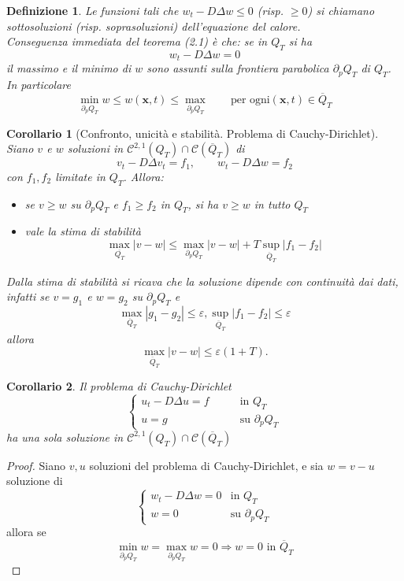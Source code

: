 \documentclass[a4paper,12pt, draft]{article}
\theoremstyle{break}
\newtheorem{corollary}{Corollario}[section]
\newtheorem{definition}{Definizione}[section]
\let\epsilon\varepsilon
\numberwithin{equation}{section}
\begin{document}
\begin{definition}
Le funzioni tali che $w_t - D\Delta w \leq 0$ (risp. $\geq 0$) si chiamano sottosoluzioni (risp. soprasoluzioni) dell'equazione del calore. \\
Conseguenza immediata del teorema (2.1) è che: se in $Q_T$ si ha
$$w_t -D \Delta w = 0$$
il massimo e il minimo di $w$ sono assunti sulla frontiera parabolica $\partial_p Q_T$ di $Q_T$. In particolare
$$
\min_{\partial_p Q_T} w \leq w(\bm{x},t) \leq \max_{\partial_p Q_T} \qquad \mbox{per ogni} (\bm{x}, t) \in \overline{Q}_T$$
\end{definition}
\begin{corollary}[Confronto, unicità e stabilità. Problema di Cauchy-Dirichlet]
Siano $v$ e $w$ soluzioni in $\mathcal{C}^{2,1}(Q_T)\cap \mathcal{C}(\overline{Q}_T)$ di
$$
v_t-D\Delta v_t = f_1, \qquad w_t -D\Delta w =f_2
$$
con $f_1, f_2$ limitate in $Q_T$. Allora:
\begin{itemize}
\item[a)] se $v \geq w$ su $\partial_p Q_T$ e $f_1 \geq f_2$ in $Q_T$, si ha $v \geq w$ in tutto $Q_T$
\item[b)] vale la stima di stabilità 
$$
\max_{\overline{Q_T}}|v - w| \leq \max_{\partial_p Q_T}|v - w| + T\sup_{\overline{Q}_T}|f_1-f_2|
$$
\end{itemize}

Dalla stima di stabilità si ricava che la soluzione dipende con continuità dai dati, infatti se $v = g_1$ e $w = g_2$ su $\partial_p Q_T$ e 
$$
\max_{\overline{Q}_T} |g_1 - g_2| \leq \epsilon, \sup_{\overline{Q}_T}|f_1 - f_2| \leq \epsilon
$$
allora 
$$
\max_{\overline{Q}_T} |v - w| \leq \epsilon(1 + T).
$$
\end{corollary}
\begin{corollary}
Il problema di Cauchy-Dirichlet
$$
\begin{cases}
u_t -D\Delta u = f & \qquad \mbox{in } Q_T \\
u = g & \qquad \mbox{su }\partial_p Q_T
\end{cases}
$$
ha una sola soluzione in $\mathcal{C}^{2,1}(Q_T)\cap \mathcal{C}(\overline{Q}_T)$
\end{corollary}
\begin{proof}
Siano $v, u$ soluzioni del problema di Cauchy-Dirichlet, e sia $w = v - u$ soluzione di
$$
\begin{cases}
w_t - D\Delta w = 0 & \mbox{in }Q_T \\
w = 0 & \mbox{su } \partial_p Q_T
\end{cases}
$$
allora se 
$$
\min_{\partial_p Q_T} w = \max_{\partial_p Q_T} w = 0 \Longrightarrow w = 0 \mbox{ in } \overline{Q}_T
$$
\end{proof}
\end{document}
